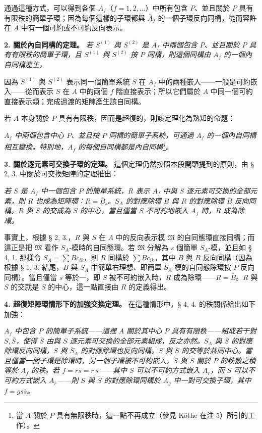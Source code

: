 \documentclass[11pt]{article}
\providecommand{\frM}{\mathfrak M}
\begin{document}
通過這種方式，可以得到各個 \(A_f\)（\(f=1,2,\ldots\)）中所有包含 \(P\)、並且關於 \(P\) 具有有限秩的簡單子環；因為每個這樣的子環都與 \(\overline A_f\) 的一個子環反向同構，從而容許在 \(A\) 中有一個可約或不可約反向表示。

\noindent\textbf{2. 關於內自同構的定理。} \emph{若 \(S^{(1)}\) 與 \(S^{(2)}\) 是 \(A_f\) 中兩個包含 \(P\)、並且關於 \(P\) 具有有限秩的簡單子環，且 \(S^{(1)}\) 與 \(S^{(2)}\) 按 \(P\) 同構，則這個同構由 \(A_f\) 的一個內自同構產生。}

因為 \(S^{(1)}\) 與 \(S^{(2)}\) 表示同一個簡單系統 \(S\) 在 \(A_f\) 中的兩種嵌入——一般是可約嵌入——從而表示 \(S\) 在 \(A\) 中的兩個 \(f\) 階直接表示；所以它們屬於 \(A\) 中同一個可約直接表示類；完成過渡的矩陣產生該自同構。

若 \(A\) 本身關於 \(P\) 具有有限秩，因而是超復的，則該定理化為熟知的命題：

\emph{\(A_f\) 中兩個包含中心 \(P\)、並且按 \(P\) 同構的簡單子系統，可通過 \(A_f\) 的一個內自同構相互變換。特別地，\(A_f\) 的每個自同構都是內自同構\footnote{\normalfont 當 \(A\) 關於 \(P\) 具有無限秩時，這一點不再成立（參見 Köthe 在注 5）所引的工作）。}。}

\noindent\textbf{3. 關於逐元素可交換子環的定理。}
這個定理仍然按照本段開頭提到的原則，由 § 2, 3. 中關於可交換矩陣的定理推出：

\emph{若 \(S\) 是 \(A_f\) 中一個包含 \(P\) 的簡單系統，\(R\) 表示 \(A_f\) 中與 \(S\) 逐元素可交換的全部元素，則 \(R\) 也成為矩陣環：\(R=\overline B_s\)。\(S_A\) 的對應除環 \(B\) 與 \(R\) 的對應除環 \(\overline B\) 反向同構。\(R\) 與 \(S\) 的交成為 \(S\) 的中心。當且僅當 \(S\) 不可約地嵌入 \(A_f\) 時，\(R\) 成為除環。}

事實上，根據 § 2, 3.，\(R\) 與 \(S\) 在 \(A\) 中的反向表示模 \(\frM\) 的自同態環直接同構；而這正是把 \(\frM\) 看作 \(S_A\)-模時的自同態環。若 \(\frM\) 分解為 \(s\) 個簡單 \(S_A\)-模，並且如 § 4, 1. 那樣令 \(S_A=\sum Bc_{ik}\)，則 \(R\) 同構於 \(\sum \overline Bc_{ik}\)，其中 \(B\) 與 \(\overline B\) 反向同構（因為根據 § 1, 3. 結尾，\(B\) 與 \(S_A\) 中簡單右理想、即簡單 \(S_A\)-模的自同態除環按 \(P\) 反向同構）。當且僅當 \(s\) 等於一，即 \(S\) 被不可約嵌入時，\(R\) 成為除環——\(R=\overline B\)。\(R\) 與 \(S\) 的交就是 \(S\) 的中心，這一點直接由 \(R\) 的定義得出。

\noindent\textbf{4. 超復矩陣環情形下的加強交換定理。} 在這種情形中，§ 4, 4. 的秩關係給出如下加強：

\emph{\(A_f\) 中包含 \(P\) 的簡單子系統——這裡 \(A\) 關於其中心 \(P\) 具有有限秩——組成若干對 \(S,\overline S\)，使得 \(\overline S\) 由與 \(S\) 逐元素可交換的全部元素組成，反之亦然。\(S_A\) 與 \(\overline S\) 的對應除環反向同構，\(S\) 與 \(\overline S_A\) 的對應除環也反向同構。\(S\) 與 \(\overline S\) 的交等於共同中心。當且僅當一個子環是除環時，另一個子環被不可約嵌入。\(S\) 與 \(\overline S\) 關於 \(P\) 的秩數之積等於 \(A_f\) 的秩。若 \(f=rs=\overline r\,\overline s\)——其中 \(S\) 可以不可約方式嵌入 \(A_r\)，而 \(\overline S\) 可以不可約方式嵌入 \(A_{\overline r}\)——則 \(S\) 與 \(\overline S\) 的對應除環同構於 \(A_g\) 中一對可交換子環，其中 \(f=g s\overline s\)。}
\end{document}
